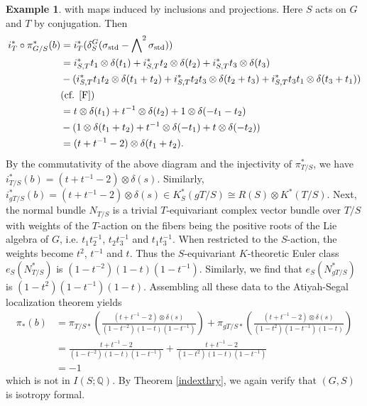 \documentclass[11pt]{amsart}
\theoremstyle{plain}
\theoremstyle{definition}
\newtheorem{example}[theorem]{Example}
\begin{document}
\begin{example}
	with maps induced by inclusions and projections. Here $S$ acts on $G$ and $T$ by conjugation. Then
	\begin{align*}
		i_{T}^*\circ\pi^*_{G/S}(b)&=i_T^*(\delta_S^G(\sigma_{\text{std}}-\bigwedge\nolimits^2\sigma_{\text{std}}))\\
							&=i_{S, T}^*t_1\otimes \delta(t_1)+i_{S, T}^*t_2\otimes\delta(t_2)+i_{S, T}^*t_3\otimes\delta(t_3)\\
							&-(i_{S, T}^*t_1t_2\otimes\delta(t_1+t_2)+i_{S, T}^*t_2t_3\otimes\delta(t_2+t_3)+i_{S, T}^*t_3t_1\otimes\delta(t_3+t_1))\\
							&(\text{cf. \cite[Lemma 4.19]{F}})\\
							&=t\otimes\delta(t_1)+t^{-1}\otimes\delta(t_2)+1\otimes\delta(-t_1-t_2)\\
							&-(1\otimes\delta(t_1+t_2)+t^{-1}\otimes\delta(-t_1)+t\otimes\delta(-t_2))\\
							&=(t+t^{-1}-2)\otimes\delta(t_1+t_2).
	\end{align*}
	By the commutativity of the above diagram and the injectivity of $\pi_{T/S}^*$, we have $i_{T/S}^*(b)=(t+t^{-1}-2)\otimes\delta(s)$. Similarly, $i_{gT/S}^*(b)=(t+t^{-1}-2)\otimes\delta(s)\in K_S^*(gT/S)\cong R(S)\otimes K^*(T/S)$. Next, the normal bundle $N_{T/S}$ is a trivial $T$-equivariant complex vector bundle over $T/S$ with weights of the $T$-action on the fibers being the positive roots of the Lie algebra of $G$, i.e. $t_1t_2^{-1}$, $t_2t_3^{-1}$ and $t_1t_3^{-1}$. When restricted to the $S$-action, the weights become $t^2$, $t^{-1}$ and $t$. Thus the $S$-equivariant $K$-theoretic Euler class $e_S(N_{T/S}^*)$ is $(1-t^{-2})(1-t)(1-t^{-1})$. Similarly, we find that $e_S(N_{gT/S}^*)$ is $(1-t^2)(1-t^{-1})(1-t)$. Assembling all these data to the Atiyah-Segal localization theorem yields
	\begin{align*}
		\pi_*(b)&=\pi_{T/S*}\left(\frac{(t+t^{-1}-2)\otimes\delta(s)}{(1-t^{-2})(1-t)(1-t^{-1})}\right)+\pi_{gT/S*}\left(\frac{(t+t^{-1}-2)\otimes\delta(s)}{(1-t^2)(1-t^{-1})(1-t)}\right)\\
				&=\frac{t+t^{-1}-2}{(1-t^{-2})(1-t)(1-t^{-1})}+\frac{t+t^{-1}-2}{(1-t^2)(1-t)(1-t^{-1})}\\
				&=-1
	\end{align*}
	which is not in $I(S; \mathbb{Q})$. By Theorem \ref{indexthry}, we again verify that $(G, S)$ is isotropy formal.
\end{example}
\end{document}

